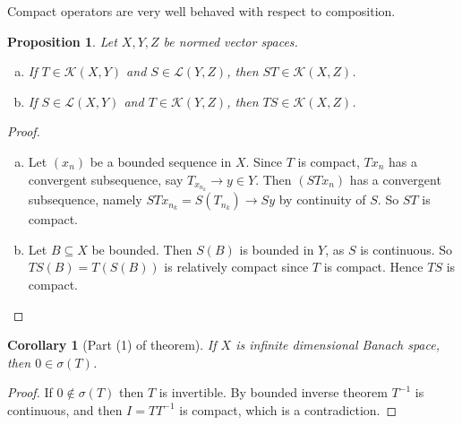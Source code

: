\documentclass[10pt, oneside, reqno]{amsbook}
\theoremstyle{plain}%
\newtheorem{prop}[thm]{Proposition}
\newtheorem*{cor}{Corollary}
\theoremstyle{definition}
\theoremstyle{remark}
\begin{document}
Compact operators are very well behaved with respect to composition.  
\begin{prop}
    Let $X, Y, Z$ be normed vector spaces.  
    \begin{enumerate}[(a)]
        \item If $T \in \mathcal K(X, Y)$ and $S \in \mathcal L(Y, Z)$, then $
            ST \in \mathcal K(X, Z)
        $.
        \item If $S \in \mathcal L(X, Y)$ and $T \in \mathcal K(Y, Z)$, then $
            TS \in \mathcal K(X, Z)
        $.
    \end{enumerate}
\end{prop}
\begin{proof}
    \begin{enumerate}[(a)]
        \item Let $(x_n)$ be a bounded sequence in $X$.  Since $T$ is compact, $Tx_n$ has a convergent subsequence, say $T_{x_{n_k}} \rightarrow y \in Y$. Then $(STx_n)$ has a convergent subsequence, namely $STx_{n_k} = S(T_{n_k}) \rightarrow Sy$  by continuity of $S$.  So $ST$ is compact. 
        \item Let $B \subseteq X$ be bounded.  Then $S(B)$ is bounded in $Y$, as $S$ is continuous.  So $TS(B) = T(S(B))$ is relatively compact since $T$ is compact. Hence $TS$ is compact.
    \end{enumerate}
\end{proof}

\begin{cor}[Part (1) of theorem]
    If $X$ is infinite dimensional Banach space, then $0 \in \sigma(T)$.  
\end{cor}
\begin{proof}
    If $0 \notin \sigma(T)$ then $T$ is invertible.  By bounded inverse theorem $T^{-1}$ is continuous, and then $I = T T^{-1}$ is compact, which is a contradiction.
\end{proof}
\end{document}
